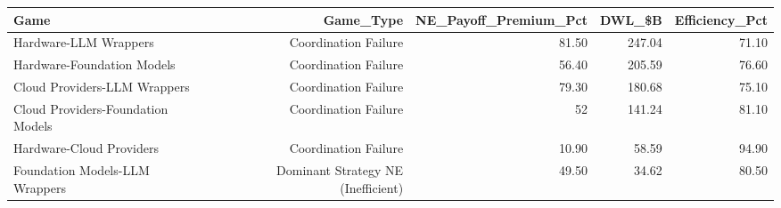 

\begin{tabular}{@{}lrrrr@{}}
\toprule
Game & Game\_Type & NE\_Payoff\_Premium\_Pct & DWL\_\$B & Efficiency\_Pct \\
\midrule
Hardware-LLM Wrappers & Coordination Failure & 81.50 & 247.04 & 71.10 \\
Hardware-Foundation Models & Coordination Failure & 56.40 & 205.59 & 76.60 \\
Cloud Providers-LLM Wrappers & Coordination Failure & 79.30 & 180.68 & 75.10 \\
Cloud Providers-Foundation Models & Coordination Failure & 52 & 141.24 & 81.10 \\
Hardware-Cloud Providers & Coordination Failure & 10.90 & 58.59 & 94.90 \\
Foundation Models-LLM Wrappers & Dominant Strategy NE (Inefficient) & 49.50 & 34.62 & 80.50 \\
\bottomrule
\end{tabular}